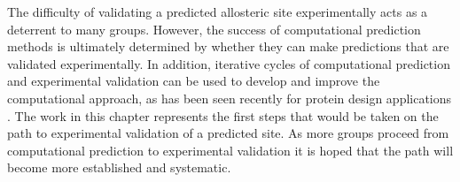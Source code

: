 The difficulty of validating a predicted allosteric site experimentally acts as a deterrent to many groups.
However, the success of computational prediction methods is ultimately determined by whether they can make predictions that are validated experimentally.
In addition, iterative cycles of computational prediction and experimental validation can be used to develop and improve the computational approach, as has been seen recently for protein design applications \cite{Rocklin2017}.
The work in this chapter represents the first steps that would be taken on the path to experimental validation of a predicted site.
As more groups proceed from computational prediction to experimental validation \cite{Brecher2017} it is hoped that the path will become more established and systematic.
